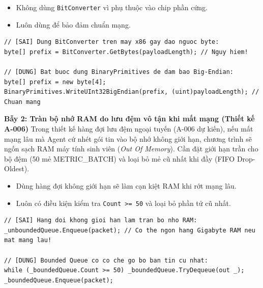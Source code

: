 \documentclass[12pt,a4paper]{article}
\begin{document}
\begin{orientationbox}
\begin{itemize}[leftmargin=1.5em, itemsep=1pt]
  \item Không dùng \texttt{BitConverter} vì phụ thuộc vào chip phần cứng.
  \item Luôn dùng  để bảo đảm chuẩn mạng.
\end{itemize}
\end{orientationbox}

\begin{lstlisting}[language=CSharp, caption={So sánh Bẫy 1: Little-Endian vs Big-Endian chuẩn}]
// [SAI] Dung BitConverter tren may x86 gay dao nguoc byte:
byte[] prefix = BitConverter.GetBytes(payloadLength); // Nguy hiem!

// [DUNG] Bat buoc dung BinaryPrimitives de dam bao Big-Endian:
byte[] prefix = new byte[4];
BinaryPrimitives.WriteUInt32BigEndian(prefix, (uint)payloadLength); // Chuan mang
\end{lstlisting}

\begin{pitfallbox}
\textbf{Bẫy 2: Tràn bộ nhớ RAM do lưu đệm vô tận khi mất mạng (Thiết kế A-006)}
\newline Trong thiết kế hàng đợi lưu đệm ngoại tuyến (A-006 dự kiến), nếu mất mạng lâu mà Agent cứ nhét gói tin vào bộ nhớ không giới hạn, chương trình sẽ ngốn sạch RAM máy tính sinh viên (\textit{Out Of Memory}). Cần đặt giới hạn trần cho bộ đệm (50 mẻ METRIC\_BATCH) và loại bỏ mẻ cũ nhất khi đầy (FIFO Drop-Oldest).
\end{pitfallbox}

\begin{orientationbox}
\begin{itemize}[leftmargin=1.5em, itemsep=1pt]
  \item Dùng hàng đợi không giới hạn sẽ làm cạn kiệt RAM khi rớt mạng lâu.
  \item Luôn có điều kiện kiểm tra \texttt{Count >= 50} và loại bỏ phần tử cũ nhất.
\end{itemize}
\end{orientationbox}

\begin{lstlisting}[language=CSharp, caption={So sánh Bẫy 2: Hàng đợi vô hạn vs Bounded FIFO Queue}]
// [SAI] Hang doi khong gioi han lam tran bo nho RAM:
_unboundedQueue.Enqueue(packet); // Co the ngon hang Gigabyte RAM neu mat mang lau!

// [DUNG] Bounded Queue co co che go bo ban tin cu nhat:
while (_boundedQueue.Count >= 50) _boundedQueue.TryDequeue(out _);
_boundedQueue.Enqueue(packet);
\end{lstlisting}
\end{document}

